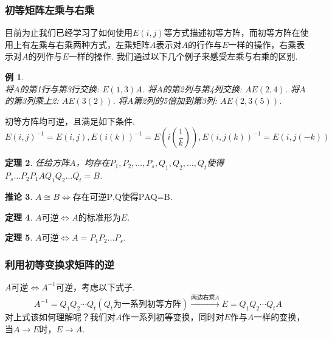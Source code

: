\documentclass[12pt, a4paper, oneside]{ctexbook}
\newtheorem{theorem}{定理}[section]
\newtheorem{corollary}[theorem]{推论}
\newtheorem{example}[theorem]{例}
\begin{document}
\subsubsection{初等矩阵左乘与右乘}

目前为止我们已经学习了如何使用$E(i,j)$等方式描述初等方阵，而初等方阵在使用上有左乘与右乘两种方式，左乘矩阵$A$表示对$A$的行作与$E$一样的操作，右乘表示对$A$的列作与$E$一样的操作. 
我们通过以下几个例子来感受左乘与右乘的区别. 

\begin{example}
    ~\\

    将$A$的第1行与第3行交换: $E(1,3)A$. 
    \newline
    将$A$的第2列与第4列交换: $AE(2,4)$. 
    \newline
    将$A$的第3列乘上2: $AE(3(2))$. 
    \newline
    将$A$第2列的5倍加到第3列: $AE(2,3(5))$. 
\end{example}

初等方阵均可逆，且满足如下条件. 
$$E(i,j)^{-1} = E(i,j), E(i(k))^{-1} = E(i(\frac{1}{k})), E(i,j(k))^{-1} = E(i,j(-k))$$

\begin{theorem}
    任给方阵$A$，均存在$P_1, P_2, \dots, P_s, Q_1, Q_2, \dots, Q_t$使得$P_s \dots P_2P_1AQ_1Q_2 \dots Q_t = B$. 
\end{theorem}

\begin{corollary}
    $A \cong B \Leftrightarrow \mbox{存在可逆P,Q使得PAQ=B}$.
\end{corollary}

\begin{theorem}
    $A\mbox{可逆} \Leftrightarrow \mbox{$A$的标准形为$E$}$.
\end{theorem}

\begin{theorem}
    $A\mbox{可逆} \Leftrightarrow A= P_1P_2 \dots P_s$. 
\end{theorem}

\subsubsection{利用初等变换求矩阵的逆}

$A \mbox{可逆} \Leftrightarrow A^{-1} \mbox{可逆}$，考虑以下式子. 
$$A^{-1} = Q_1Q_2 \cdots Q_t (\mbox{$Q_t$为一系列初等方阵}) \xrightarrow{\mbox{两边右乘$A$}} E=Q_1Q_2 \cdots Q_tA$$
对上式该如何理解呢？我们对$A$作一系列初等变换，同时对$E$作与$A$一样的变换，当$A \rightarrow E$时，$E \rightarrow A$. 
\end{document}
